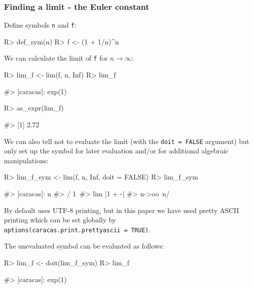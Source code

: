 \hypertarget{finding-a-limit---the-euler-constant}{%
\subsubsection{Finding a limit - the Euler
constant}\label{finding-a-limit---the-euler-constant}}

Define symbols \texttt{n} and \texttt{f}:

\begin{Schunk}
\begin{Sinput}
R> def_sym(n)
R> f <- (1 + 1/n)^n
\end{Sinput}
\end{Schunk}

We can calculate the limit of \texttt{f} for \(n \to \infty\):

\begin{Schunk}
\begin{Sinput}
R> lim_f <- lim(f, n, Inf)
R> lim_f
\end{Sinput}
\begin{Soutput}
#> [caracas]: exp(1)
\end{Soutput}
\begin{Sinput}
R> as_expr(lim_f)
\end{Sinput}
\begin{Soutput}
#> [1] 2.72
\end{Soutput}
\end{Schunk}

We can also tell  not to evaluate the limit (with the
\texttt{doit\ =\ FALSE} argument) but only set up the symbol for later
evaluation and/or for additional algebraic manipulations:

\begin{Schunk}
\begin{Sinput}
R> lim_f_sym <- lim(f, n, Inf, doit = FALSE)
R> lim_f_sym
\end{Sinput}
\begin{Soutput}
#> [caracas]:             n
#>                 /    1\ 
#>             lim |1 + -| 
#>            n->oo\    n/
\end{Soutput}
\end{Schunk}

By default  uses UTF-8 printing, but in this paper we
have used pretty ASCII printing which can be set globally by
\texttt{options(caracas.print.prettyascii\ =\ TRUE)}.

The unevaluated symbol can be evaluated as follows:

\begin{Schunk}
\begin{Sinput}
R> lim_f <- doit(lim_f_sym) 
R> lim_f
\end{Sinput}
\begin{Soutput}
#> [caracas]: exp(1)
\end{Soutput}
\end{Schunk}

